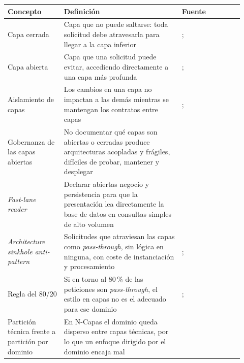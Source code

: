 \begin{table}[htbp]
  \centering
  \footnotesize
  \renewcommand{\arraystretch}{1.2}
  \begin{tabular}{@{}p{0.22\linewidth}p{0.46\linewidth}p{0.24\linewidth}@{}}
    \toprule
    \textbf{Concepto} & \textbf{Definición} & \textbf{Fuente} \\
    \midrule
    \raggedright Capa cerrada
      & \raggedright Capa que no puede saltarse: toda solicitud debe atravesarla para llegar a
        la capa inferior
      & \raggedright \textcite[3]{richards2015}; \textcite[cap.~10]{richardsford2020}
        \tabularnewline
    \raggedright Capa abierta
      & \raggedright Capa que una solicitud puede evitar, accediendo directamente a una capa más
        profunda
      & \raggedright \textcite[3]{richards2015}; \textcite[cap.~10]{richardsford2020}
        \tabularnewline
    \raggedright Aislamiento de capas
      & \raggedright Los cambios en una capa no impactan a las demás mientras se mantengan los
        contratos entre capas
      & \raggedright \textcite[3-4]{richards2015}; \textcite[cap.~10]{richardsford2020}
        \tabularnewline
    \raggedright Gobernanza de las capas abiertas
      & \raggedright No documentar qué capas son abiertas o cerradas produce arquitecturas
        acopladas y frágiles, difíciles de probar, mantener y desplegar
      & \raggedright \textcite[5]{richards2015} \tabularnewline
    \raggedright \emph{Fast-lane reader}
      & \raggedright Declarar abiertas negocio y persistencia para que la presentación lea
        directamente la base de datos en consultas simples de alto volumen
      & \raggedright \textcite[cap.~10]{richardsford2020} \tabularnewline
    \raggedright \emph{Architecture sinkhole anti-pattern}
      & \raggedright Solicitudes que atraviesan las capas como \emph{pass-through}, sin lógica
        en ninguna, con coste de instanciación y procesamiento
      & \raggedright \textcite[7]{richards2015}; \textcite[cap.~10]{richardsford2020}
        \tabularnewline
    \raggedright Regla del 80/20
      & \raggedright Si en torno al 80\,\% de las peticiones son \emph{pass-through}, el estilo
        en capas no es el adecuado para ese dominio
      & \raggedright \textcite[7]{richards2015}; \textcite[cap.~10]{richardsford2020}
        \tabularnewline
    \raggedright Partición técnica frente a partición por dominio
      & \raggedright En N-Capas el dominio queda disperso entre capas técnicas, por lo que un
        enfoque dirigido por el dominio encaja mal
      & \raggedright \textcite[cap.~10]{richardsford2020} \tabularnewline

\end{tabular}
\end{table}
